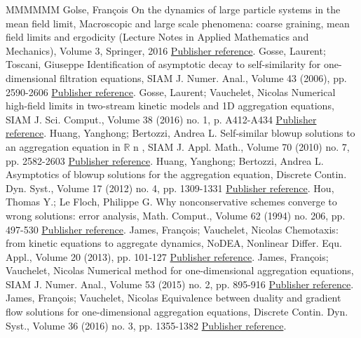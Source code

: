 \documentclass[11pt]{article}
\theoremstyle{definition}
\numberwithin{equation}{section}
\begin{document}
\begin{thebibliography}{MMMMMM}
 Golse, François On the dynamics of large particle systems in the mean field limit, Macroscopic and large scale phenomena: coarse graining, mean field limits and ergodicity (Lecture Notes in Applied Mathematics and Mechanics), Volume 3, Springer, 2016 \href{https://ahl.centre-mersenne.org/item/AHL_2020__3__217_0/#Golse}{Publisher reference}.
 Gosse, Laurent; Toscani, Giuseppe Identification of asymptotic decay to self-similarity for one-dimensional filtration equations, SIAM J. Numer. Anal., Volume 43 (2006), pp. 2590-2606 \href{https://ahl.centre-mersenne.org/item/AHL_2020__3__217_0/#GT}{Publisher reference}.
 Gosse, Laurent; Vauchelet, Nicolas Numerical high-field limits in two-stream kinetic models and 1D aggregation equations, SIAM J. Sci. Comput., Volume 38 (2016) no. 1, p. A412-A434 \href{https://ahl.centre-mersenne.org/item/AHL_2020__3__217_0/#sisc}{Publisher reference}.
 Huang, Yanghong; Bertozzi, Andrea L. Self-similar blowup solutions to an aggregation equation in \ensuremath{\mathbb{R}} n , SIAM J. Appl. Math., Volume 70 (2010) no. 7, pp. 2582-2603 \href{https://ahl.centre-mersenne.org/item/AHL_2020__3__217_0/#Huang2}{Publisher reference}.
 Huang, Yanghong; Bertozzi, Andrea L. Asymptotics of blowup solutions for the aggregation equation, Discrete Contin. Dyn. Syst., Volume 17 (2012) no. 4, pp. 1309-1331 \href{https://ahl.centre-mersenne.org/item/AHL_2020__3__217_0/#Huang1}{Publisher reference}.
 Hou, Thomas Y.; Le Floch, Philippe G. Why nonconservative schemes converge to wrong solutions: error analysis, Math. Comput., Volume 62 (1994) no. 206, pp. 497-530 \href{https://ahl.centre-mersenne.org/item/AHL_2020__3__217_0/#Legloc}{Publisher reference}.
 James, François; Vauchelet, Nicolas Chemotaxis: from kinetic equations to aggregate dynamics, NoDEA, Nonlinear Differ. Equ. Appl., Volume 20 (2013), pp. 101-127 \href{https://ahl.centre-mersenne.org/item/AHL_2020__3__217_0/#NoDEA}{Publisher reference}.
 James, François; Vauchelet, Nicolas Numerical method for one-dimensional aggregation equations, SIAM J. Numer. Anal., Volume 53 (2015) no. 2, pp. 895-916 \href{https://ahl.centre-mersenne.org/item/AHL_2020__3__217_0/#sinum}{Publisher reference}.
 James, François; Vauchelet, Nicolas Equivalence between duality and gradient flow solutions for one-dimensional aggregation equations, Discrete Contin. Dyn. Syst., Volume 36 (2016) no. 3, pp. 1355-1382 \href{https://ahl.centre-mersenne.org/item/AHL_2020__3__217_0/#GF_dual}{Publisher reference}.

\end{thebibliography}
\end{document}

